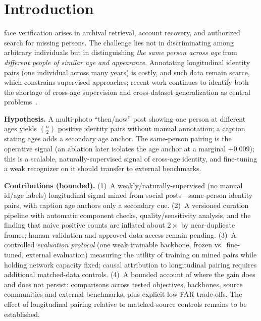 \documentclass[journal]{IEEEtran}
\begin{document}
\maketitle
\IEEEdisplaynontitleabstractindextext
\IEEEpeerreviewmaketitle

\section{Introduction}\label{sec:intro}
 face verification arises in archival retrieval, account recovery, and authorized search for missing persons. The challenge lies not in discriminating among arbitrary individuals but in distinguishing \emph{the same person across age} from \emph{different people of similar age and appearance}. Annotating longitudinal identity pairs (one individual across many years) is costly, and such data remain scarce, which constrains supervised approaches; recent work continues to identify both the shortage of cross-age supervision and cross-dataset generalization as central problems~\cite{wang2024cacon,cao2026hmlf}.

\textbf{Hypothesis.} A multi-photo ``then/now'' post showing one person at different ages yields $\binom{n}{2}$ positive identity pairs without manual annotation; a caption stating ages adds a secondary age anchor. The same-person pairing is the operative signal (an ablation later isolates the age anchor at a marginal $+$0.009); this is a scalable, naturally-supervised signal of cross-age identity, and fine-tuning a weak recognizer on it should transfer to external benchmarks.

\textbf{Contributions (bounded).}
(1)~A weakly/naturally-supervised (no manual id/age labels) longitudinal signal mined from social posts---same-person identity pairs, with caption age anchors only a secondary cue.
(2)~A versioned curation pipeline with automatic component checks, quality/sensitivity analysis, and the finding that naive positive counts are inflated about $2\times$ by near-duplicate frames; human validation and approved data access remain pending.
(3)~A controlled \emph{evaluation protocol} (one weak trainable backbone, frozen vs.\ fine-tuned, external evaluation) measuring the utility of training on mined pairs while holding network capacity fixed; causal attribution to longitudinal pairing requires additional matched-data controls.
(4)~A bounded account of where the gain does and does not persist: comparisons across tested objectives, backbones, source communities and external benchmarks, plus explicit low-FAR trade-offs. The effect of longitudinal pairing relative to matched-source controls remains to be established.
\end{document}
